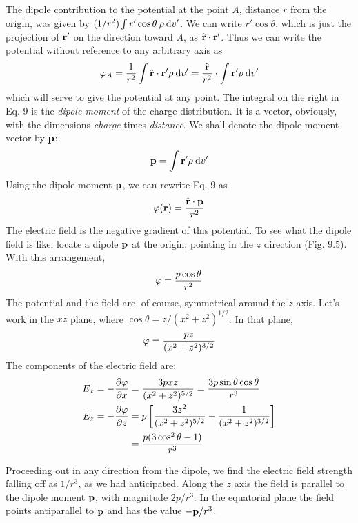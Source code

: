 The dipole contribution to the potential at the point $A$, distance
$r$ from the origin, was given by $(1/r^2)\int r' \cos \theta\:\rho\:\textup{d} v'$. We can write
$r' \cos \theta$, which is just the projection of $\mathbf{r}'$ on the direction toward $A$,
as $\hat{\mathbf{r}}\cdot\mathbf{r}'$. Thus we can write the potential without reference to any
arbitrary axis as
\begin{equation}
  \varphi_A = \frac{1}{r^2}\int \hat{\mathbf{r}}\cdot\mathbf{r}'\rho\:\textup{d} v'
      = \frac{\hat{\mathbf{r}}}{r^2}\cdot\int \mathbf{r}'\rho\:\textup{d} v'
\end{equation}
which will serve to give the potential at any point. The integral on
the right in Eq. 9 is the \emph{dipole moment} of the charge distribution. It
is a vector, obviously, with the dimensions \emph{charge} times \emph{distance}. We
shall denote the dipole moment vector by $\mathbf{p}$:
\begin{equation}
  \mathbf{p} = \int \mathbf{r}'\rho\:\textup{d} v'
\end{equation}
Using the dipole moment $\mathbf{p}$, we can rewrite Eq. 9 as
\begin{equation}
  \varphi(\mathbf{r}) = \frac{\hat{\mathbf{r}}\cdot\mathbf{p}}{r^2}
\end{equation}
The electric field is the negative gradient of this potential. To see
what the dipole field is like, locate a dipole $\mathbf{p}$ at the origin, pointing
in the $z$ direction (Fig. 9.5). With this arrangement,
\begin{equation}
  \varphi = \frac{p\cos\theta}{r^2}
\end{equation}
The potential and the field are, of course, symmetrical around the
$z$ axis. Let's work in the $xz$ plane, where $\cos \theta = z/ (x^2 + z^2)^{1/2}$. In
that plane,
\begin{equation}
  \varphi = \frac{pz}{(x^2 + z^2)^{3/2}}
\end{equation}
The components of the electric field are:
\begin{align}
\begin{split}
  E_x = -\frac{\partial\varphi}{\partial x} &= \frac{3pxz}{(x^2 + z^2)^{5/2}} = \frac{3p\sin\theta\cos\theta}{r^3} \\
  E_z = -\frac{\partial\varphi}{\partial z} 
   &= p\left[\frac{3z^2}{(x^2 + z^2)^{5/2}}-\frac{1}{(x^2 + z^2)^{3/2}}\right] \\
   &= \frac{p(3\cos^2\theta-1)}{r^3}
\end{split}
\end{align}

Proceeding out in any direction from the dipole, we find the electric
field strength falling off as $1/r^3$, as we had anticipated. Along
the $z$ axis the field is parallel to the dipole moment $\mathbf{p}$, with magnitude
$2p/r^3$. In the equatorial plane the field points antiparallel to $\mathbf{p}$ and
has the value $-\mathbf{p}/r^3$.

